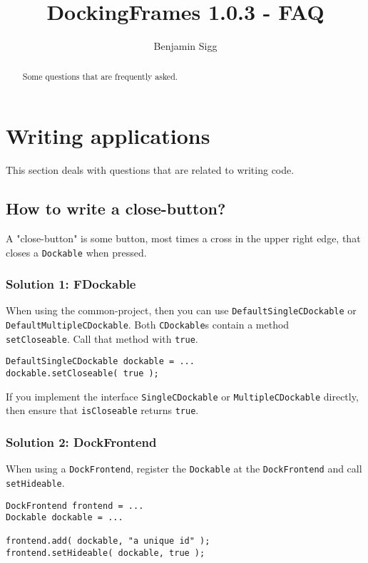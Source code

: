 \documentclass[a4paper,10pt]{article}
\title{DockingFrames 1.0.3 - FAQ}
\author{Benjamin Sigg}
\newcommand{\src}[1]{\lstinline[basicstyle=\normalsize\ttfamily,keywordstyle=\normalsize\ttfamily,identifierstyle=\normalsize\ttfamily]|#1|}
\begin{document}
\maketitle
\tableofcontents
\newpage

\begin{abstract}Some questions that are frequently asked.
\end{abstract}

\section{Writing applications}
This section deals with questions that are related to writing code.
\subsection{How to write a close-button?}
A "close-button" is some button, most times a cross in the upper right edge, that closes a \src{Dockable} when pressed.
\subsubsection{Solution 1: FDockable}
When using the common-project, then you can use \src{DefaultSingleCDockable} or \src{DefaultMultipleCDockable}. Both \src{CDockable}s contain a method \\\src{setCloseable}. Call that method with \src{true}.
\begin{lstlisting}
DefaultSingleCDockable dockable = ...
dockable.setCloseable( true );
\end{lstlisting}
If you implement the interface \src{SingleCDockable} or \src{MultipleCDockable} directly, then ensure that \src{isCloseable} returns \src{true}.

\subsubsection{Solution 2: DockFrontend}
When using a \src{DockFrontend}, register the \src{Dockable} at the \src{DockFrontend} and call \src{setHideable}.
\begin{lstlisting}
DockFrontend frontend = ...
Dockable dockable = ...

frontend.add( dockable, "a unique id" );
frontend.setHideable( dockable, true );
\end{lstlisting}
\end{document}
